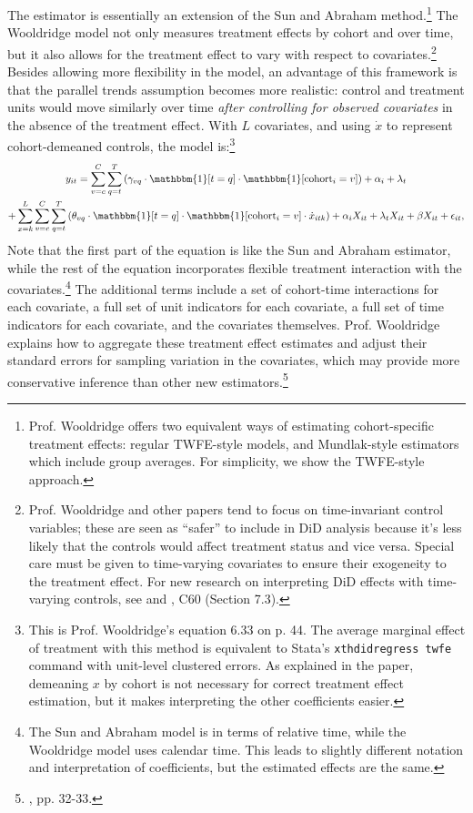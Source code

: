 \documentclass[12pt]{article}
\begin{document}
The \citet{wooldridge2021two} estimator is essentially an extension of the Sun and Abraham method.\footnote{Prof. Wooldridge offers two equivalent ways of estimating cohort-specific treatment effects: regular TWFE-style models, and Mundlak-style estimators which include group averages. For simplicity, we show the TWFE-style approach.}  The Wooldridge model not only measures treatment effects by cohort and over time, but it also allows for the treatment effect to vary with respect to covariates.\footnote{Prof. Wooldridge and other papers tend to focus on time-invariant control variables; these are seen as “safer” to include in DiD analysis because it’s less likely that the controls would affect treatment status and vice versa. Special care must be given to time-varying covariates to ensure their exogeneity to the treatment effect. For new research on interpreting DiD effects with time-varying controls, see \citet{caetano2023} and \citet{wooldridge2023nonlinear}, C60 (Section 7.3).} Besides allowing more flexibility in the model, an advantage of this framework is that the parallel trends assumption becomes more realistic: control and treatment units would move similarly over time \textit{after controlling for observed covariates} in the absence of the treatment effect. With $L$ covariates, and using $\dot{x}$ to represent cohort-demeaned controls, the model is:\footnote{This is Prof. Wooldridge’s equation 6.33 on p. 44. The average marginal effect of treatment with this method is equivalent to Stata’s \texttt{xthdidregress twfe} command with unit-level clustered errors. As explained in the paper, demeaning $x$ by cohort is not necessary for correct treatment effect estimation, but it makes interpreting the other coefficients easier.}
\begin{multline}
    y_{it} = \sum_{v=c}^C\sum_{q=t}^T\left(\gamma_{vq}\cdot\mathbbm{1}[t=q]\cdot \mathbbm{1}[\text{cohort}_i=v]\right) + \alpha_i + \lambda_t \\
    + \sum_{x=k}^L\sum_{v=c}^C\sum_{q=t}^T\left(\theta_{vq}\cdot \mathbbm{1}[t=q]\cdot \mathbbm{1}[\text{cohort}_i=v] \cdot \dot{x}_{itk}\right) + \alpha_i X_{it} + \lambda_t X_{it} + \beta X_{it} +\epsilon_{it},
\end{multline}
Note that the first part of the equation is like the Sun and Abraham estimator, while the rest of the equation incorporates flexible treatment interaction with the covariates.\footnote{The Sun and Abraham model is in terms of relative time, while the Wooldridge model uses calendar time. This leads to slightly different notation and interpretation of coefficients, but the estimated effects are the same.}  The additional terms include a set of cohort-time interactions for each covariate, a full set of unit indicators for each covariate, a full set of time indicators for each covariate, and the covariates themselves. Prof. Wooldridge explains how to aggregate these treatment effect estimates and adjust their standard errors for sampling variation in the covariates, which may provide more conservative inference than other new estimators.\footnote{\citet{wooldridge2021two}, pp. 32-33.}
\end{document}
